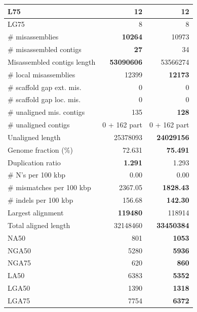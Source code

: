 \documentclass[12pt,a4paper]{article}
\begin{document}
\begin{table}[ht]
\begin{center}
\begin{tabular}{|l*{2}{|r}|}
L75 & 12 & 12 \\ \hline
LG75 & 8 & 8 \\ \hline
\# misassemblies & {\bf 10264} & 10973 \\ \hline
\# misassembled contigs & {\bf 27} & 34 \\ \hline
Misassembled contigs length & {\bf 53090606} & 53566274 \\ \hline
\# local misassemblies & 12399 & {\bf 12173} \\ \hline
\# scaffold gap ext. mis. & 0 & 0 \\ \hline
\# scaffold gap loc. mis. & 0 & 0 \\ \hline
\# unaligned mis. contigs & 135 & {\bf 128} \\ \hline
\# unaligned contigs & 0 + 162 part & 0 + 162 part \\ \hline
Unaligned length & 25378093 & {\bf 24029156} \\ \hline
Genome fraction (\%) & 72.631 & {\bf 75.491} \\ \hline
Duplication ratio & {\bf 1.291} & 1.293 \\ \hline
\# N's per 100 kbp & 0.00 & 0.00 \\ \hline
\# mismatches per 100 kbp & 2367.05 & {\bf 1828.43} \\ \hline
\# indels per 100 kbp & 156.68 & {\bf 142.30} \\ \hline
Largest alignment & {\bf 119480} & 118914 \\ \hline
Total aligned length & 32148460 & {\bf 33450384} \\ \hline
NA50 & 801 & {\bf 1053} \\ \hline
NGA50 & 5280 & {\bf 5936} \\ \hline
NGA75 & 620 & {\bf 860} \\ \hline
LA50 & 6383 & {\bf 5352} \\ \hline
LGA50 & 1390 & {\bf 1318} \\ \hline
LGA75 & 7754 & {\bf 6372} \\ \hline
\end{tabular}
\end{center}
\end{table}
\end{document}
